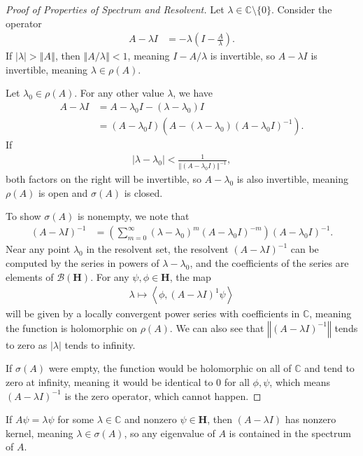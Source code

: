 \documentclass[12pt]{extarticle}
\newcommand{\C}{\mathbb{C}}
\newcommand{\iprod}[2]{\left\langle #1,#2\right\rangle}
\newcommand{\norm}[1]{\left\Vert #1\right\Vert}
\theoremstyle{plain}
\theoremstyle{definition}
\theoremstyle{remark}
\renewcommand{\newline}{\hfill\break}
\begin{document}
  \begin{proof}[Proof of Properties of Spectrum and Resolvent]
    Let $\lambda \in \C\setminus \{0\}$. Consider the operator
    \begin{align*}
      A - \lambda I &= -\lambda \left(I - \frac{A}{\lambda}\right).
    \end{align*}
    If $|\lambda| > \norm{A}$, then $\norm{A / \lambda} < 1$, meaning $I - A/\lambda$ is invertible, so $A - \lambda I$ is invertible, meaning $\lambda \in \rho(A)$.\newline

    Let $\lambda_0\in \rho(A)$. For any other value $\lambda$, we have
    \begin{align*}
      A - \lambda I &= A - \lambda_0 I - (\lambda - \lambda_0)I\\
                    &= (A-\lambda_0 I)\left(A - (\lambda - \lambda_0)(A-\lambda_0 I)^{-1}\right).
    \end{align*}
    If
    \begin{align*}
      |\lambda - \lambda_0| < \frac{1}{\norm{(A - \lambda_0 I)}^{-1}},
    \end{align*}
    both factors on the right will be invertible, so $A - \lambda_0$ is also invertible, meaning $\rho(A)$ is open and $\sigma(A)$ is closed.\newline

    To show $\sigma(A)$ is nonempty, we note that
    \begin{align*}
      \left(A - \lambda I\right)^{-1} &= \left(\sum_{m=0}^{\infty}\left(\lambda - \lambda_0\right)^m\left(A - \lambda_0 I\right)^{-m}\right)\left(A - \lambda_0 I\right)^{-1}.
    \end{align*}
    Near any point $\lambda_0$ in the resolvent set, the resolvent $(A-\lambda I)^{-1}$ can be computed by the series in powers of $\lambda - \lambda_0$, and the coefficients of the series are elements of $\mathcal{B}\left(\mathbf{H}\right)$. For any $\psi,\phi \in \mathbf{H}$, the map
    \begin{align*}
      \lambda \mapsto \iprod{\phi}{(A-\lambda I)^{1}\psi}
    \end{align*}
    will be given by a locally convergent power series with coefficients in $\C$, meaning the function is holomorphic on $\rho(A)$. We can also see that $\norm{\left(A-\lambda I\right)^{-1}}$ tends to zero as $|\lambda|$ tends to infinity.\newline

    If $\sigma(A)$ were empty, the function would be holomorphic on all of $\C$ and tend to zero at infinity, meaning it would be identical to $0$ for all $\phi,\psi$, which means $\left(A-\lambda I\right)^{-1}$ is the zero operator, which cannot happen.
  \end{proof}
  If $A\psi = \lambda \psi$ for some $\lambda \in \C$ and nonzero $\psi \in \mathbf{H}$, then $(A - \lambda I)$ has nonzero kernel, meaning $\lambda \in \sigma(A)$, so any eigenvalue of $A$ is contained in the spectrum of $A$.\newline
\end{document}
